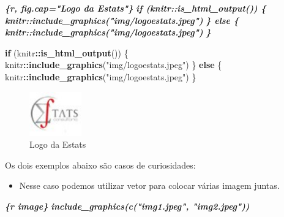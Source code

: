 \documentclass[
]{book}
\newenvironment{Shaded}{\begin{snugshade}}{\end{snugshade}}
\newcommand{\ControlFlowTok}[1]{\textcolor[rgb]{0.13,0.29,0.53}{\textbf{#1}}}
\newcommand{\InformationTok}[1]{\textcolor[rgb]{0.56,0.35,0.01}{\textbf{\textit{#1}}}}
\newcommand{\KeywordTok}[1]{\textcolor[rgb]{0.13,0.29,0.53}{\textbf{#1}}}
\newcommand{\NormalTok}[1]{#1}
\newcommand{\OperatorTok}[1]{\textcolor[rgb]{0.81,0.36,0.00}{\textbf{#1}}}
\newcommand{\StringTok}[1]{\textcolor[rgb]{0.31,0.60,0.02}{#1}}
\providecommand{\tightlist}{%
  \setlength{\itemsep}{0pt}\setlength{\parskip}{0pt}}
\begin{document}
\begin{Shaded}
\begin{Highlighting}[]
\InformationTok{\textasciigrave{}\textasciigrave{}\textasciigrave{}\{r, fig.cap="Logo da Estats"\}}
\InformationTok{if (knitr::is\_html\_output()) \{}
\InformationTok{    knitr::include\_graphics("img/logoestats.jpeg")}
\InformationTok{\} else \{}
\InformationTok{    knitr::include\_graphics("img/logoestats.jpeg")}
\InformationTok{\}}
\InformationTok{\textasciigrave{}\textasciigrave{}\textasciigrave{}}
\end{Highlighting}
\end{Shaded}

\begin{Shaded}
\begin{Highlighting}[]
\ControlFlowTok{if}\NormalTok{ (knitr}\OperatorTok{::}\KeywordTok{is\_html\_output}\NormalTok{()) \{}
\NormalTok{    knitr}\OperatorTok{::}\KeywordTok{include\_graphics}\NormalTok{(}\StringTok{"img/logoestats.jpeg"}\NormalTok{)}
\NormalTok{\} }\ControlFlowTok{else}\NormalTok{ \{}
\NormalTok{    knitr}\OperatorTok{::}\KeywordTok{include\_graphics}\NormalTok{(}\StringTok{"img/logoestats.jpeg"}\NormalTok{)}
\NormalTok{\}}
\end{Highlighting}
\end{Shaded}

\begin{figure}[h]

{\centering \includegraphics[width=0.89in]{img/logoestats} 

}

\caption{Logo da Estats}\label{fig:unnamed-chunk-3}
\end{figure}

Os dois exemplos abaixo são casos de curiosidades:

\begin{itemize}
\tightlist
\item
  Nesse caso podemos utilizar vetor para colocar várias imagem juntas.
\end{itemize}

\begin{Shaded}
\begin{Highlighting}[]
\InformationTok{\textasciigrave{}\textasciigrave{}\textasciigrave{}\{r image\}}
\InformationTok{include\_graphics(c("img1.jpeg", "img2.jpeg"))}
\InformationTok{\textasciigrave{}\textasciigrave{}\textasciigrave{}}
\end{Highlighting}
\end{Shaded}
\end{document}
